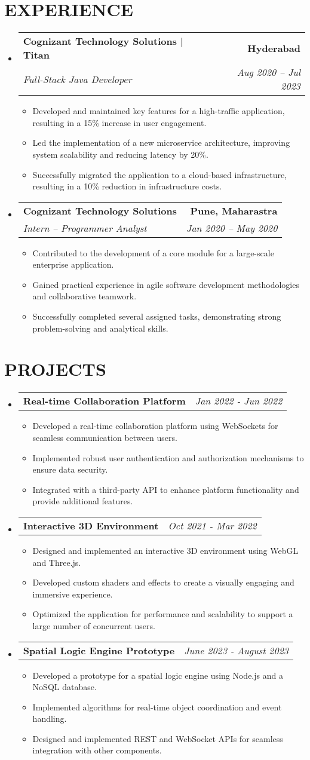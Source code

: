 \documentclass[letterpaper,11pt]{article}
\makeatletter
\newcommand{\resumeItem}[1]{\item\small{{#1 \vspace{-3pt}}}}
\newcommand{\resumeSubheading}[4]{\vspace{-2pt}\item\begin{tabular*}{0.97\textwidth}[t]{l@{\extracolsep{\fill}}r}\textbf{#1} & #2 \\ \textit{\small#3} & \textit{\small #4} \\ \end{tabular*}\vspace{-7pt}}
\newcommand{\resumeProjectHeading}[2]{\item\begin{tabular*}{0.97\textwidth}{l@{\extracolsep{\fill}}r}\small#1 & #2 \\ \end{tabular*}\vspace{-7pt}}
\newcommand{\resumeSubHeadingListStart}{\begin{itemize}[leftmargin=0.15in, label={}]}
\newcommand{\resumeSubHeadingListEnd}{\end{itemize}}
\newcommand{\resumeItemListStart}{\begin{itemize}}
\newcommand{\resumeItemListEnd}{\end{itemize}\vspace{-5pt}}
\makeatother
\begin{document}
\section{{\fontsize{9pt}{20pt}\selectfont \textbf{EXPERIENCE}}}\resumeSubHeadingListStart
\resumeSubheading{Cognizant Technology Solutions | Titan}{\textbf{Hyderabad}}{Full-Stack Java Developer}{Aug 2020 – Jul 2023}
\resumeItemListStart
\resumeItem{Developed and maintained key features for a high-traffic application, resulting in a 15\% increase in user engagement.}
\resumeItem{Led the implementation of a new microservice architecture, improving system scalability and reducing latency by 20\%.}
\resumeItem{Successfully migrated the application to a cloud-based infrastructure, resulting in a 10\% reduction in infrastructure costs.}
\resumeItemListEnd
\resumeSubheading{Cognizant Technology Solutions}{\textbf{Pune, Maharastra}}{Intern – Programmer Analyst}{Jan 2020 – May 2020}
\resumeItemListStart
\resumeItem{Contributed to the development of a core module for a large-scale enterprise application.}
\resumeItem{Gained practical experience in agile software development methodologies and collaborative teamwork.}
\resumeItem{Successfully completed several assigned tasks, demonstrating strong problem-solving and analytical skills.}
\resumeItemListEnd
\resumeSubHeadingListEnd\vspace{-17pt}
\section{{\fontsize{9pt}{20pt}\selectfont \textbf{PROJECTS}}}\resumeSubHeadingListStart
\resumeProjectHeading{\textbf{Real-time Collaboration Platform}}{\textit{Jan 2022 - Jun 2022}}
\resumeItemListStart
\resumeItem{Developed a real-time collaboration platform using WebSockets for seamless communication between users.}
\resumeItem{Implemented robust user authentication and authorization mechanisms to ensure data security.}
\resumeItem{Integrated with a third-party API to enhance platform functionality and provide additional features.}
\resumeItemListEnd\vspace{-6pt}
\resumeProjectHeading{\textbf{Interactive 3D Environment}}{\textit{Oct 2021 - Mar 2022}}
\resumeItemListStart
\resumeItem{Designed and implemented an interactive 3D environment using WebGL and Three.js.}
\resumeItem{Developed custom shaders and effects to create a visually engaging and immersive experience.}
\resumeItem{Optimized the application for performance and scalability to support a large number of concurrent users.}
\resumeItemListEnd\vspace{-6pt}
\resumeProjectHeading{\textbf{Spatial Logic Engine Prototype}}{\textit{June 2023 - August 2023}}
\resumeItemListStart
\resumeItem{Developed a prototype for a spatial logic engine using Node.js and a NoSQL database.}
\resumeItem{Implemented algorithms for real-time object coordination and event handling.}
\resumeItem{Designed and implemented REST and WebSocket APIs for seamless integration with other components.}
\resumeItemListEnd
\resumeSubHeadingListEnd\vspace{-17pt}
\end{document}
